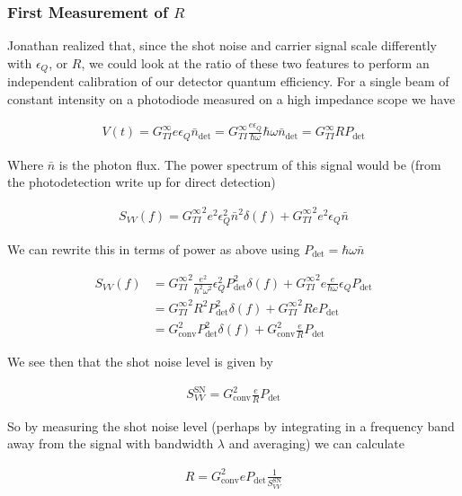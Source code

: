 \documentclass[12pt]{article}
\begin{document}
\subsubsection{First Measurement of $R$}
Jonathan realized that, since the shot noise and carrier signal scale differently with $\epsilon_Q$, or $R$, we could look at the ratio of these two features to perform an independent calibration of our detector quantum efficiency. For a single beam of constant intensity on a photodiode measured on a high impedance scope we have

\begin{align}
V(t) = G_{TI}^{\infty} e \epsilon_Q \bar{n}_{\text{det}} = G_{TI}^{\infty} \frac{e \epsilon_Q}{\hbar \omega} \hbar \omega \bar{n}_{\text{det}} = G_{TI}^{\infty} R P_{\text{det}}
\end{align}

Where $\bar{n}$ is the photon flux. The power spectrum of this signal would be (from the photodetection write up for direct detection)

\begin{align}
S_{VV}(f) = {G_{TI}^{\infty}}^2 e^2 \epsilon_Q^2 \bar{n}^2\delta(f) + {G_{TI}^{\infty}}^2 e^2 \epsilon_Q \bar{n}
\end{align}

We can rewrite this in terms of power as above using $P_{\text{det}} = \hbar \omega \bar{n}$

\begin{align}
S_{VV}(f) &= {G_{TI}^{\infty}}^2 \frac{e^2}{\hbar^2 \omega^2} \epsilon_Q^2 P_{\text{det}}^2\delta(f) + {G_{TI}^{\infty}}^2 e \frac{e}{\hbar \omega} \epsilon_Q P_{\text{det}}\\
&= {G_{TI}^{\infty}}^2 R^2 P_{\text{det}}^2 \delta(f) + {G_{TI}^{\infty}}^2 R e P_{\text{det}}\\
&= G_{\text{conv}}^2 P_{\text{det}}^2 \delta(f) + G_{\text{conv}}^2 \frac{e}{R} P_{\text{det}}
\end{align}

We see then that the shot noise level is given by

\begin{align}
S^{\text{SN}}_{VV} = G_{\text{conv}}^2 \frac{e}{R}P_{\text{det}}
\end{align}

So by measuring the shot noise level (perhaps by integrating in a frequency band away from the signal with bandwidth $\lambda$ and averaging) we can calculate

\begin{align}
R = G_{\text{conv}}^2 e P_{\text{det}} \frac{1}{S^{\text{SN}}_{VV}}
\end{align}
\end{document}
